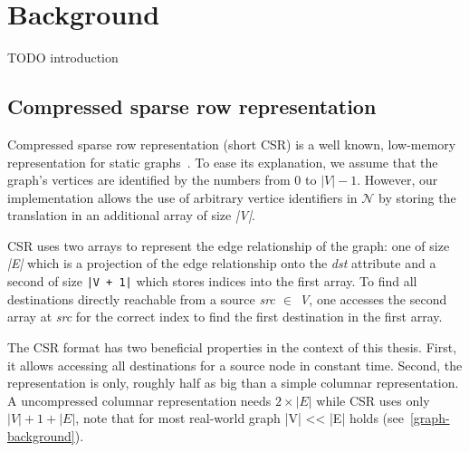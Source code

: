 \section{Background}\label{sec:background}

TODO introduction

\subsection{Compressed sparse row representation}\label{subsec:compressed-sparse-row-representation}
Compressed sparse row representation (short CSR) is a well known, low-memory representation for static graphs~\cite{csr,csr-first}.
To ease its explanation, we assume that the graph's vertices are identified by the numbers from 0 to $|V| - 1$.
However, our implementation allows the use of arbitrary vertice identifiers in $\mathcal{N}$ by storing the translation in an additional
array of size \textit{|V|}.

CSR uses two arrays to represent the edge relationship of the graph: one of size \textit{|E|} which is a projection of the edge relationship
onto the \textit{dst} attribute and a second of size \texttt{|V + 1|} which stores indices into the first array.
To find all destinations directly reachable from a source \textit{src $\in$ V}, one accesses the second array at \textit{src} for the
correct index to find the first destination in the first array.

The CSR format has two beneficial properties in the context of this thesis.
First, it allows accessing all destinations for a source node in constant time.
Second, the representation is only, roughly half as big than a simple columnar representation.
A uncompressed columnar representation needs $2 \times |E|$ while CSR uses only $|V| + 1 + |E|$, note that for most real-world graph |V|
<< |E| holds (see~\cref{graph-background}).
